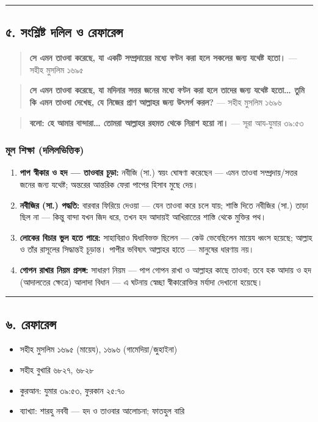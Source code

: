 \medskip\hrule\medskip

\subsection*{৫. সংশ্লিষ্ট দলিল ও রেফারেন্স}

\begin{quote}
\textbf{সে এমন তাওবা করেছে, যা একটি সম্প্রদায়ের মধ্যে বণ্টন করা হলে সকলের জন্য যথেষ্ট হতো।} — সহীহ মুসলিম ১৬৯৫
\end{quote}

\begin{quote}
\textbf{সে এমন তাওবা করেছে, যা মদিনার সত্তর জনের মধ্যে বণ্টন করা হলে তাদের জন্য যথেষ্ট হতো… তুমি কি এমন তাওবা দেখেছ, যে নিজের প্রাণ আল্লাহর জন্য উৎসর্গ করল?} — সহীহ মুসলিম ১৬৯৬
\end{quote}

\begin{quote}
\textbf{বলো: হে আমার বান্দারা… তোমরা আল্লাহর রহমত থেকে নিরাশ হয়ো না।} — সূরা আয-যুমার ৩৯:৫৩
\end{quote}

\subsubsection*{মূল শিক্ষা (দলিলভিত্তিক)}

\begin{enumerate}
\item \textbf{পাপ স্বীকার ও হদ — তাওবার চূড়া:} নবীজি (সা.) স্বয়ং ঘোষণা করেছেন — এমন তাওবা সম্প্রদায়/সত্তর জনের জন্য যথেষ্ট; অন্তরের আন্তরিক ফেরা পাপের হিসাব মুছে দেয়।
\item \textbf{নবীজির (সা.) পদ্ধতি:} বারবার ফিরিয়ে দেওয়া — যেন তাওবা করে চলে যায়; শাস্তি দিতে নবীজির (সা.) তাড়া ছিল না — কিন্তু বান্দা যখন জিদ ধরে, তখন হদ আদায়ই আখিরাতের শাস্তি থেকে মুক্তির পথ।
\item \textbf{লোকের বিচার ভুল হতে পারে:} সাহাবিরাও দ্বিধাবিভক্ত ছিলেন — কেউ ভেবেছিলেন মায়েয ধ্বংস হয়েছে; আল্লাহ ও তাঁর রাসূলের সিদ্ধান্তই চূড়ান্ত। পাপীর ভবিষ্যৎ আল্লাহর হাতে — মানুষের ধারণায় নয়।
\item \textbf{গোপন রাখার নিয়ম প্রসঙ্গ:} সাধারণ নিয়ম — পাপ গোপন রাখা ও আল্লাহর কাছে তাওবা; তবে হক আদায় ও হদ (আদালতের ক্ষেত্রে) আলাদা বিধান — এ ঘটনায় স্বেচ্ছা স্বীকারোক্তির মর্যাদা দেখানো হয়েছে।
\end{enumerate}
\medskip\hrule\medskip

\subsection*{৬. রেফারেন্স}

\begin{itemize}
\item সহীহ মুসলিম ১৬৯৫ (মায়েয), ১৬৯৬ (গামেদিয়া/জুহাইনা)
\item সহীহ বুখারি ৬৮২৭, ৬৮২৮
\item কুরআন: যুমার ৩৯:৫৩, ফুরকান ২৫:৭০
\item ব্যাখ্যা: শারহু নববী — হদ ও তাওবার আলোচনা; ফাতহুল বারি
\end{itemize}


